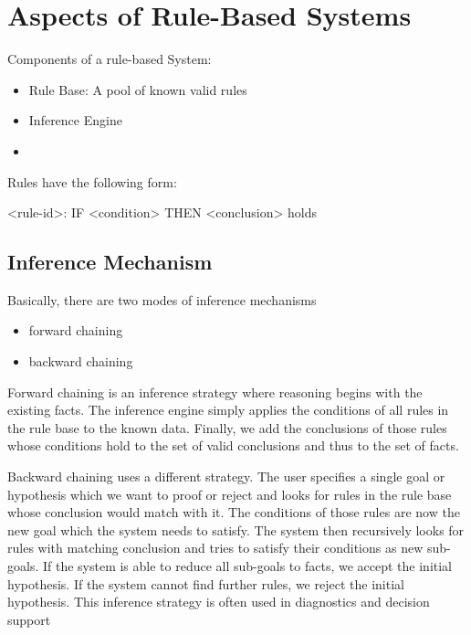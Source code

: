 \chapter{Aspects of Rule-Based Systems}\label{ch:aspects-of-rule-based-systems}

Components of a rule-based System:

\begin{itemize}
    \item Rule Base: A pool of known valid rules
    \item Inference Engine
    \item
\end{itemize}


Rules have the following form:

<rule-id>: IF <condition> THEN <conclusion> holds


\section{Inference Mechanism}

Basically, there are two modes of inference mechanisms\cite{https://doi.org/10.1002/widm.11}

\begin{itemize}
    \item forward chaining
    \item backward chaining
\end{itemize}


Forward chaining is an inference strategy where reasoning begins with the existing facts.
The inference engine simply applies the conditions of all rules in the rule base to the known data.
Finally, we add the conclusions of those rules whose conditions hold to the set of valid conclusions and thus to the set of facts.

Backward chaining uses a different strategy\cite{al2015comparison}.
The user specifies a single goal or hypothesis which we want to proof or reject and looks for rules in the rule base whose conclusion would match with it.
The conditions of those rules are now the new goal which the system needs to satisfy.
The system then recursively looks for rules with matching conclusion and tries to satisfy their conditions as new sub-goals.
If the system is able to reduce all sub-goals to facts, we accept the initial hypothesis.
If the system cannot find further rules, we reject the initial hypothesis.
This inference strategy is often used in diagnostics and decision support\cite{https://doi.org/10.1002/widm.11}

